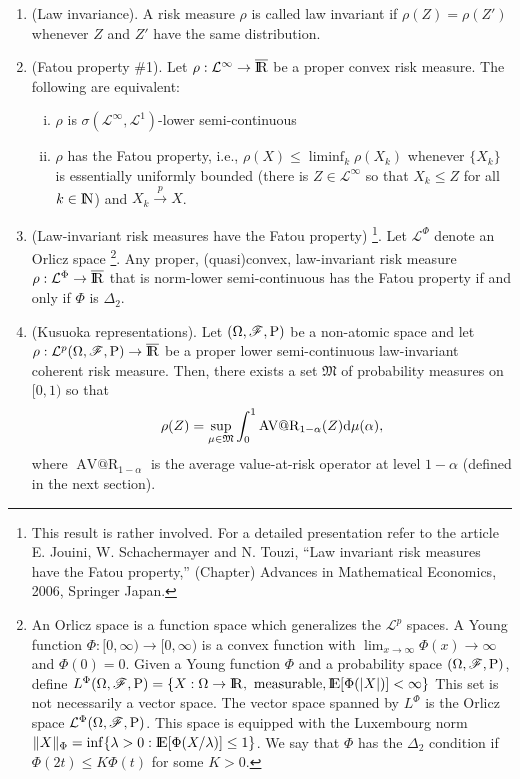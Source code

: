 \documentclass[a4paper,10pt]{article}
\begin{document}
\begin{enumerate}
 \item (Law invariance). A risk measure $\rho$ is called law invariant if $\rho(Z) = \rho(Z')$ whenever 
       $Z$ and $Z'$ have the same distribution.
       
 \item (Fatou property \#1). Let $\rho:\mathcal{L}^\infty\to \barre$ be a proper convex risk measure. 
       The following are equivalent:
       \begin{enumerate}[i.]
        \item $\rho$ is $\sigma(\mathcal{L}^\infty, \mathcal{L}^1)$-lower semi-continuous
        \item $\rho$ has the Fatou property, i.e., $\rho(X) \leq \liminf_{k}\rho(X_k)$ whenever
              $\{X_k\}$ is essentially uniformly bounded (there is $Z\in\mathcal{L}^\infty$ so that $X_k\leq Z$ for all $k\in\N$)
              and $X_k\overset{p}{\longrightarrow}X$.
       \end{enumerate}

 \item (Law-invariant risk measures have the Fatou property)%
	  \footnote{This result is rather involved. For a detailed
	  presentation refer to the article E. Jouini, W. Schachermayer and N. Touzi, 
	  ``Law invariant risk measures have 
	  the Fatou property,'' (Chapter) Advances in Mathematical Economics, 2006, Springer Japan.}.
       Let $\mathcal{L}^\Phi$ denote an Orlicz space%
	  \footnote{An Orlicz space is a function space which generalizes 
	            the $\mathcal{L}^p$ spaces. A Young function $\Phi:[0,\infty)\to[0,\infty)$ is a convex function 
	            with $\lim_{x\to\infty} \Phi(x)\to\infty$ and $\Phi(0)= 0$.
	            Given a Young function $\Phi$ and a probability space $(\Omega,\mathscr{F},\mathrm{P})$, define 
	            $L^\Phi\ofp= \{X:\Omega\to\Re, \text{ measurable}, \E[\Phi(|X|)] < \infty\}$
	            This set is not necessarily a vector space. The vector space spanned by $L^\Phi$
	            is the Orlicz space $\mathcal{L}^\Phi(\Omega,\mathscr{F},\mathrm{P})$. This space is equipped with the Luxembourg 
	            norm $\|X\|_\Phi = \inf\{\lambda>0:\E[\Phi(X/\lambda)]\leq 1\}$. We say that $\Phi$
	            has the $\Delta_2$ condition if $\Phi(2t) \leq K \Phi(t)$ for some $K>0$.}. 
       Any proper, (quasi)convex, law-invariant risk measure $\rho:\mathcal{L}^\Phi\to\barre$
       that is norm-lower semi-continuous has the Fatou property if and only if $\Phi$ is $\Delta_2$.
 
 \item (Kusuoka representations). Let $(\Omega,\mathscr{F},\mathrm{P})$ be a non-atomic space and let $\rho:\mathcal{L}^p\ofp\to\barre$ be a proper
       lower semi-continuous law-invariant coherent risk measure. Then, there exists a set $\mathfrak{M}$ of probability measures 
       on $[0,1)$ so that 
       \[
        \rho(Z) = \sup_{\mu\in\mathfrak{M}}\int_{0}^{1}\operatorname{AV@R}_{1-\alpha}(Z)\mathrm{d}\mu(\alpha),
       \]
       where $\operatorname{AV@R}_{1-\alpha}$ is the average value-at-risk operator at level $1-\alpha$ (defined 
       in the next section).


\end{enumerate}
\end{document}
